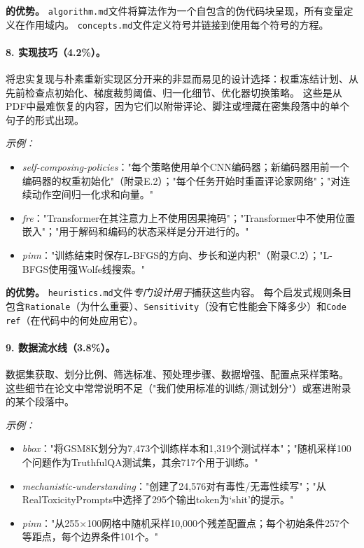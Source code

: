 \noindent\textbf{\ara{}的优势。}
\texttt{algorithm.md}文件将算法作为一个自包含的伪代码块呈现，所有变量定义在作用域内。
\texttt{concepts.md}文件定义符号并链接到使用每个符号的方程。

\paragraph{8. 实现技巧（4.2\%）。}
将忠实复现与朴素重新实现区分开来的非显而易见的设计选择：权重冻结计划、从先前检查点初始化、梯度裁剪阈值、归一化细节、优化器切换策略。
这些是从PDF中最难恢复的内容，因为它们以附带评论、脚注或埋藏在密集段落中的单个句子的形式出现。

\emph{示例：}
\begin{itemize}[leftmargin=*, itemsep=1pt]
  \item \emph{self-composing-policies}："每个策略使用单个CNN编码器；新编码器用前一个编码器的权重初始化"（附录E.2）；"每个任务开始时重置评论家网络"；"对连续动作空间归一化求和向量。"
  \item \emph{fre}："Transformer在其注意力上不使用因果掩码"；"Transformer中不使用位置嵌入"；"用于解码和编码的状态采样是分开进行的。"
  \item \emph{pinn}："训练结束时保存L-BFGS的方向、步长和逆内积"（附录C.2）；"L-BFGS使用强Wolfe线搜索。"
\end{itemize}

\noindent\textbf{\ara{}的优势。}
\texttt{heuristics.md}文件\emph{专门设计用于}捕获这些内容。
每个启发式规则条目包含\texttt{Rationale}（为什么重要）、\texttt{Sensitivity}（没有它性能会下降多少）和\texttt{Code ref}（在代码中的何处应用它）。

\paragraph{9. 数据流水线（3.8\%）。}
数据集获取、划分比例、筛选标准、预处理步骤、数据增强、配置点采样策略。
这些细节在论文中常常说明不足（"我们使用标准的训练/测试划分"）或塞进附录的某个段落中。

\emph{示例：}
\begin{itemize}[leftmargin=*, itemsep=1pt]
  \item \emph{bbox}："将GSM8K划分为7{,}473个训练样本和1{,}319个测试样本"；"随机采样100个问题作为TruthfulQA测试集，其余717个用于训练。"
  \item \emph{mechanistic-understanding}："创建了24{,}576对有毒性/无毒性续写"；"从RealToxicityPrompts中选择了295个输出token为`shit'的提示。"
  \item \emph{pinn}："从255$\times$100网格中随机采样10{,}000个残差配置点；每个初始条件257个等距点，每个边界条件101个。"
\end{itemize}

